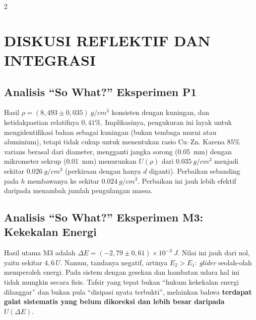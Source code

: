 \documentclass[a4paper, 12pt]{article}
\begin{document}
\begin{multicols}{2}
    \raggedcolumns
    \section{DISKUSI REFLEKTIF DAN INTEGRASI}
        \subsection{Analisis ``So What?'' Eksperimen P1}
        Hasil $\rho=(8{,}493\pm0{,}035)\ \si{g/cm^3}$ konsisten dengan kuningan, dan ketidakpastian relatifnya $0{,}41\%$. Implikasinya, pengukuran ini layak untuk mengidentifikasi bahan sebagai kuningan (bukan tembaga murni atau aluminium), tetapi tidak cukup untuk menentukan rasio Cu--Zn. Karena $85\%$ varians berasal dari diameter, mengganti jangka sorong (\SI{0,05}{mm}) dengan mikrometer sekrup (\SI{0,01}{mm}) menurunkan $U(\rho)$ dari $\SI{0,035}{g/cm^3}$ menjadi sekitar $\SI{0,026}{g/cm^3}$ (perkiraan dengan hanya $d$ diganti). Perbaikan sebanding pada $h$ membawanya ke sekitar $\SI{0,024}{g/cm^3}$. Perbaikan ini jauh lebih efektif daripada menambah jumlah pengulangan massa.

        \subsection{Analisis ``So What?'' Eksperimen M3: Kekekalan Energi}
        Hasil utama M3 adalah $\Delta E=(-2{,}79\pm0{,}61)\times10^{-3}\ \si{J}$. Nilai ini jauh dari nol, yaitu sekitar $4{,}6\,U$. Namun, tandanya negatif, artinya $E_2>E_1$: \textit{glider} seolah-olah memperoleh energi. Pada sistem dengan gesekan dan hambatan udara hal ini tidak mungkin secara fisis. Tafsir yang tepat bukan ``hukum kekekalan energi dilanggar'' dan bukan pula ``disipasi nyata terbukti'', melainkan bahwa \textbf{terdapat galat sistematis yang belum dikoreksi dan lebih besar daripada $U(\Delta E)$}.


\end{multicols}
\end{document}
